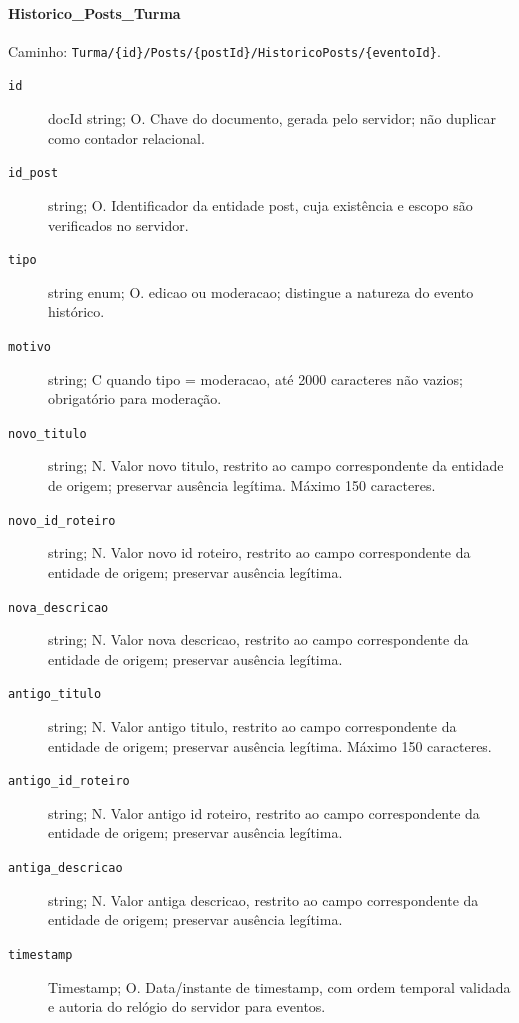 \paragraph{Historico\_Posts\_Turma}\mbox{}\par
Caminho: \texttt{Turma/\{id\}/Posts/\{postId\}/HistoricoPosts/\{eventoId\}}.
\begin{description}
\item[\texttt{id}] docId string; O. Chave do documento, gerada pelo servidor; não duplicar como contador relacional.
\item[\texttt{id\_post}] string; O. Identificador da entidade post, cuja existência e escopo são verificados no servidor.
\item[\texttt{tipo}] string enum; O. edicao ou moderacao; distingue a natureza do evento histórico.
\item[\texttt{motivo}] string; C quando tipo = moderacao, até 2000 caracteres não vazios; obrigatório para moderação.
\item[\texttt{novo\_titulo}] string; N. Valor novo titulo, restrito ao campo correspondente da entidade de origem; preservar ausência legítima. Máximo 150 caracteres.
\item[\texttt{novo\_id\_roteiro}] string; N. Valor novo id roteiro, restrito ao campo correspondente da entidade de origem; preservar ausência legítima.
\item[\texttt{nova\_descricao}] string; N. Valor nova descricao, restrito ao campo correspondente da entidade de origem; preservar ausência legítima.
\item[\texttt{antigo\_titulo}] string; N. Valor antigo titulo, restrito ao campo correspondente da entidade de origem; preservar ausência legítima. Máximo 150 caracteres.
\item[\texttt{antigo\_id\_roteiro}] string; N. Valor antigo id roteiro, restrito ao campo correspondente da entidade de origem; preservar ausência legítima.
\item[\texttt{antiga\_descricao}] string; N. Valor antiga descricao, restrito ao campo correspondente da entidade de origem; preservar ausência legítima.
\item[\texttt{timestamp}] Timestamp; O. Data/instante de timestamp, com ordem temporal validada e autoria do relógio do servidor para eventos.
\end{description}

